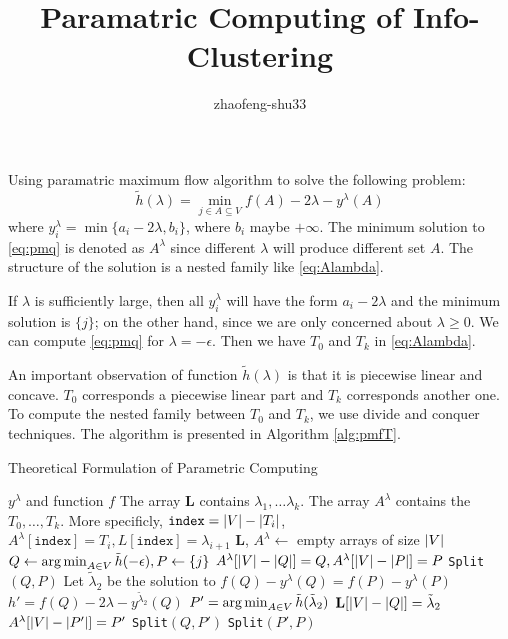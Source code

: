 \documentclass{article}
\title{Paramatric Computing of Info-Clustering}
\author{zhaofeng-shu33}
\begin{document}
\maketitle
Using paramatric maximum flow algorithm to solve the following problem:
\begin{equation}\label{eq:pmq}
\tilde{h}(\lambda) = \min_{j \in A \subseteq V} f(A) - 2\lambda - y^{\lambda}(A)
\end{equation}
where
$y^{\lambda}_i = \min\{a_i - 2\lambda, b_i\}$, where $b_i$ maybe $+\infty$.
The minimum solution to \eqref{eq:pmq} is denoted as $A^{\lambda}$ since different $\lambda$ will produce different set $A$. The structure of the solution is a nested family like \eqref{eq:Alambda}.

If $\lambda$ is sufficiently large, then all $y_i^{\lambda}$ will have the form $a_i - 2 \lambda$ and the minimum solution is $\{j\}$; on the other hand, since we are only concerned about $\lambda \geq 0$. We can compute \eqref{eq:pmq} for $\lambda = -\epsilon$. Then we have $T_0$ and $T_k$ in \eqref{eq:Alambda}.

An important observation of function $\tilde{h}(\lambda)$ is that it is piecewise linear and concave. $T_0$ corresponds a piecewise linear part and $T_k$ corresponds another one.  To compute the nested family between $T_0$ and $T_k$, we use divide and conquer techniques. The algorithm is presented in Algorithm \ref{alg:pmfT}.

\begin{algorithm}
\caption{Theoretical Formulation of Parametric Computing}\label{alg:pmfT}
\begin{algorithmic}[1]
\REQUIRE $y^{\lambda}$ and function $f$
\ENSURE The array \textbf{L} contains $\lambda_1, \dots \lambda_k$. The array $A^{\lambda}$ contains the $T_0,\dots, T_k$. More specificly, $\mathtt{index} = \lvert V\rvert - \lvert T_i\rvert$, $A^{\lambda}[\mathtt{index}]=T_i,  L[\mathtt{index}]=\lambda_{i+1}$\footnotemark
\STATE \textbf{L}, $A^{\lambda} \leftarrow$ empty arrays of size $\lvert V\rvert$
\STATE $Q \leftarrow \operatorname*{arg\,min}_{A\in V} \tilde{h}(-\epsilon), P \leftarrow \{ j \}$
\STATE $A^{\lambda}[ \lvert V\rvert-\lvert Q\rvert]=Q, A^{\lambda}[ \lvert V\rvert-\lvert P\rvert] = P$
\STATE \texttt{Split}$(Q,P)$
\STATE Let $\tilde{\lambda}_2$ be the solution to $f(Q) - y^{\lambda}(Q) = f(P) - y^{\lambda}(P)$
\STATE $h' = f(Q) - 2\lambda - y^{\tilde{\lambda}_2}(Q)$
 \STATE $P' =\operatorname*{arg\,min}_{A\in V} \tilde{h}(\tilde{\lambda}_2) $ 
 	\STATE $\mathbf{L}[\lvert V\rvert - \lvert Q\rvert] = \tilde{\lambda}_2$
 \ELSE
 	\STATE $A^{\lambda}[\lvert V\rvert - \lvert P'\rvert]=P'$
 	\STATE \texttt{Split}$(Q,P')$
 	\STATE \texttt{Split}$(P',P)$
 \ENDIF
\ENDFUNCTION
\end{algorithmic}
\end{algorithm}
\end{document}
